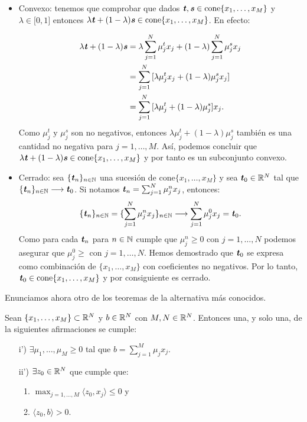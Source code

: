 \begin{itemize}
	\item  Convexo: tenemos que comprobar que dados $ \textbf{\emph{t}}, \textbf{\emph{s}} \in \mathrm{cone}\{x_1,\dots, x_M \} $ y $ \lambda \in \lbrack 0,1 \rbrack $ entonces $ \lambda\textbf{\emph{t}} + (1-\lambda)\textbf{\emph{s}} \in \mathrm{cone}\{x_1,\dots, x_M \} $. En efecto:

	\begin{equation*}
	\begin{split}
		\lambda\textbf{\emph{t}} + (1-\lambda)\textbf{\emph{s}} &=   \lambda \sum_{j=1}^{N}{\mu_j^t x_j } + (1-\lambda)\sum_{j=1}^{N}{\mu_j^s x_j } \\
		&= \sum_{j=1}^{N}{\lbrack \lambda \mu_j^t x_j  + (1-\lambda)\mu_j^s x_j \rbrack} \\
		&= \sum_{j=1}^{N}{\lbrack \lambda \mu_j^t  + (1-\lambda)\mu_j^s \rbrack x_j}.
		\end{split}
		\end{equation*}
Como $ \mu_j^t \text{ y } \mu_j^s $ son no negativos, entonces $ \lambda \mu_j^t  + (1-\lambda)\mu_j^s  $ también es una cantidad no negativa para $ j=1,\dots,M $. Así, podemos concluir que $ \lambda\textbf{\emph{t}} + (1-\lambda)\textbf{\emph{s}} \in \mathrm{cone}\{x_1,\dots, x_M \} $ y por tanto es un subconjunto convexo.

\item Cerrado: sea $ \lbrace \textbf{\emph{t}}_n \rbrace_{ n \in \mathbb{N}} $ una sucesión de $ \mathrm{cone}\{x_1,\dots, x_M \} $ y sea $ \textbf{\emph{t}}_0 \in \mathbb{R}^N $ tal que $ \lbrace \textbf{\emph{t}}_n \rbrace_{ n \in \mathbb{N}} \longrightarrow \textbf{\emph{t}}_0 $. Si notamos $ \textbf{\emph{t}}_n = \sum_{j=1}^{N}{\mu_j^n x_j }$, entonces:
\[
\lbrace \textbf{\emph{t}}_n \rbrace_{ n \in \mathbb{N}} = \lbrace \sum_{j=1}^{N}{\mu_j^n x_j } \rbrace_{ n \in \mathbb{N}} \longrightarrow \sum_{j=1}^{N}{\mu_j^0 x_j } = \textbf{\emph{t}}_0.
\]
Como para cada $ \textbf{\emph{t}}_n $ para $ n \in \mathbb{N} $ cumple que $ \mu_j^n \geq 0$ con $ j=1,\dots,N $ podemos asegurar que $ \mu_j^0 \geq $ con $ j=1,\dots,N $. Hemos demostrado que $ \textbf{\emph{t}}_0 $ se expresa como combinación de $ \{x_1,\dots, x_M \} $ con coeficientes no negativos. Por lo tanto, $ \textbf{\emph{t}}_0 \in \mathrm{cone}\{x_1,\dots, x_M \}  $ y por consiguiente es cerrado. 
\end{itemize} 

Enunciamos ahora otro de los teoremas de la alternativa más conocidos.

\begin{lemaBox}
Sean $ \{x_1,\dots, x_M \} \subset \mathbb{R}^N $ y $ b \in \mathbb{R}^N $ con $ M,N \in \mathbb{R}^N $. Entonces una, y solo una, de la siguientes afirmaciones se cumple:
\begin{itemize}
\item[i')] $ \exists \mu_1,\dots,\mu_M \geq 0 $ tal que $ b = \sum_{j=1}^{M} \mu_j x_j$.
\item[ii')]$ \exists z_0 \in \mathbb{R}^N $ que cumple que:
\begin{enumerate}
	\item $ \max_{ j=1,\dots,M} \langle z_0, x_j \rangle \leq 0$ y
	\item $ \langle z_0, b\rangle > 0$.
\end{enumerate} 
\end{itemize}
\end{lemaBox}

